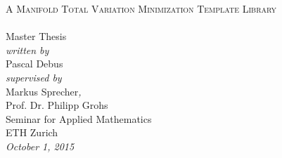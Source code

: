 \begin{titlepage}
\begin{center}
  \hfill
  \vspace{3.0cm}

  {\huge \textsc{A Manifold Total Variation Minimization Template Library\\[10pt]
  }}
  ~\\[20pt]

  {\huge{Master Thesis}}\\[2.5cm]

  {\emph{written by}}\\
  Pascal Debus
  \\[0.6cm]
  {\emph{supervised by}}\\
  Markus Sprecher{\emph{,}}\\
  Prof. Dr. Philipp Grohs\\

  Seminar for Applied Mathematics\\
  ETH Zurich
  \\[0.5cm]
  \emph{{October 1, 2015}}
\end{center}
\end{titlepage}

